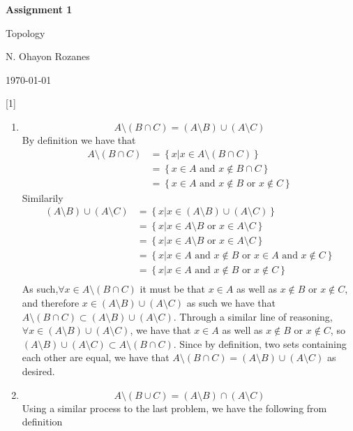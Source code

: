 \documentclass{article} %
\newcommand{\question}[2][]{
  \begin{flushleft}
    \textbf{Question #1}: \textit{#2}

\end{flushleft}}
\newcommand{\maketitletwo}[2][]{
  \begin{center}
    \Large{\textbf{Assignment #1}

    Topology} %
    \vspace{5pt}

    \normalsize{N. Ohayon Rozanes  %

    \today}        %
    \vspace{15pt}

\end{center}}
\begin{document}
\maketitletwo[1]  %

\question[1]{}
\begin{enumerate}
  \item $$A \setminus (B \cap C) = (A \setminus B) \cup (A \setminus C)$$
    By definition we have that
    \begin{align*}
      A \setminus (B\cap C) &= \left\{x \vert x \in A \setminus (B
      \cap C) \right\} \\
      &= \left\{x \in A \text{ and } x \notin B \cap C \right\} \\
      &= \left\{x \in A \text{ and } x \notin B \text{ or }  x
      \notin C \right\}
    \end{align*}
    Similarily
    \begin{align*}
      (A \setminus B) \cup (A \setminus C) &= \left\{x \vert x \in
      (A\setminus B) \cup (A \setminus C)\right\} \\
      &= \left\{x | x \in A\setminus B \text{ or }  x \in A
      \setminus C \right\} \\
      &= \left\{x | x \in A\setminus B \text{ or }  x \in A
      \setminus C \right\} \\
      &= \left\{x | x \in A \text{ and } x \notin B \text{ or }  x \in A
      \text{ and } x \notin C \right\} \\
      &= \left\{x | x \in A \text{ and } x \notin B \text{ or }
      x \notin C \right\} \\
    \end{align*}
    As such,$\forall x \in A \setminus (B \cap C)$ it must be that
    $x \in A$ as well as $x \notin B$ or $x \notin C$, and therefore
    $x \in (A \setminus B) \cup (A \setminus C)$ as such we have that
    $A \setminus (B \cap C) \subset (A \setminus B) \cup (A \setminus
    C)$. Through a similar line of reasoning, $\forall x \in
    (A\setminus B) \cup (A \setminus C)$, we have that $x \in A$ as
    well as $x \notin B$ or $x \notin C$, so $(A \setminus B)
    \cup (A \setminus C)\subset A \setminus (B\cap C)$. Since by
    definition, two sets containing each other are equal, we have
    that $A \setminus (B \cap C) = (A \setminus B) \cup (A\setminus
    C)$ as desired.
  \item  $$ A \setminus (B \cup C) = (A \setminus B) \cap (A \setminus C)$$
    Using a similar process to the last problem, we have the
    following from definition
    \begin{align*}

\end{align*}
\end{enumerate}
\end{document}
